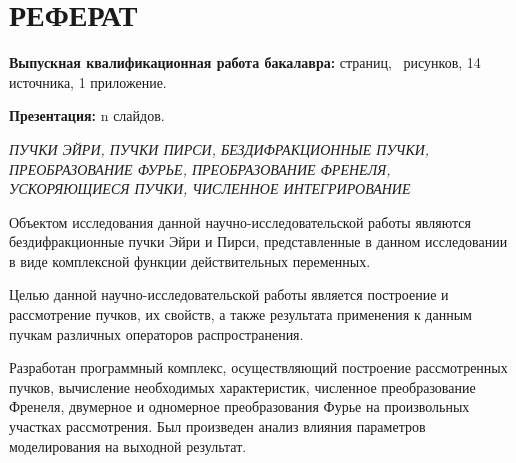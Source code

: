     \section*{РЕФЕРАТ}
    {
    \textbf{Выпускная квалификационная работа бакалавра:}
    \pageref{LastPage} страниц,
    \totalfigures\ рисунков,
    14 источника,
    1 приложение.

    \textbf{Презентация:} n слайдов.

    \textit{ПУЧКИ ЭЙРИ, ПУЧКИ ПИРСИ, БЕЗДИФРАКЦИОННЫЕ ПУЧКИ, ПРЕОБРАЗОВАНИЕ ФУРЬЕ, ПРЕОБРАЗОВАНИЕ ФРЕНЕЛЯ, УСКОРЯЮЩИЕСЯ ПУЧКИ, ЧИСЛЕННОЕ
    ИНТЕГРИРОВАНИЕ}

    Объектом исследования данной научно-исследовательской работы
    являются бездифракционные пучки Эйри и Пирси, представленные в данном
    исследовании в виде комплексной функции действительных переменных.

    Целью данной научно-исследовательской работы является построение и
    рассмотрение пучков, их свойств, а также результата применения к данным пучкам различных операторов распространения.

    Разработан программный комплекс, осуществляющий построение
    рассмотренных пучков, вычисление необходимых характеристик, численное
    преобразование Френеля, двумерное и одномерное преобразования Фурье на произвольных участках рассмотрения. Был
    произведен анализ влияния параметров моделирования на выходной результат.


    }
    \newpage

    \newpage
    \tableofcontents
    \newpage


